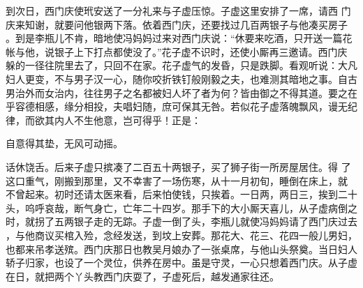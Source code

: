 到次日，西门庆使玳安送了一分礼来与子虚压惊。子虚这里安排了一席，请西
门庆来知谢，就要问他银两下落。依着西门庆，还要找过几百两银子与他凑买房子
。到是李瓶儿不肯，暗地使冯妈妈过来对西门庆说：“休要来吃酒，只开送一篇花
帐与他，说银子上下打点都使没了。”花子虚不识时，还使小厮再三邀请。西门庆
躲的一径往院里去了，只回不在家。花子虚气的发昏，只是跌脚。看观听说：大凡
妇人更变，不与男子汉一心，随你咬折铁钉般刚毅之夫，也难测其暗地之事。自古
男治外而女治内，往往男子之名都被妇人坏了者为何？皆由御之不得其道。要之在
乎容德相感，缘分相投，夫唱妇随，庶可保其无咎。若似花子虚落魄飘风，谩无纪
律，而欲其内人不生他意，岂可得乎！正是：

自意得其垫，无风可动摇。

话休饶舌。后来子虚只摈凑了二百五十两银子，买了狮子街一所房屋居住。得
了这口重气，刚搬到那里，又不幸害了一场伤寒，从十一月初旬，睡倒在床上，就
不曾起来。初时还请太医来看，后来怕使钱，只挨着。一日两，两日三，挨到二十
头，呜呼哀哉，断气身亡，亡年二十四岁。那手下的大小厮天喜儿，从子虚病倒之
时，就拐了五两银子走的无踪。子虚一倒了头，李瓶儿就使冯妈妈请了西门庆过去
，与他商议买棺入殓，念经发送，到坟上安葬。那花大、花三、花四一般儿男妇，
也都来吊孝送殡。西门庆那日也教吴月娘办了一张桌席，与他山头祭奠。当日妇人
轿子归家，也设了一个灵位，供养在房中。虽是守灵，一心只想着西门庆。从子虚
在日，就把两个丫头教西门庆耍了，子虚死后，越发通家往还。

